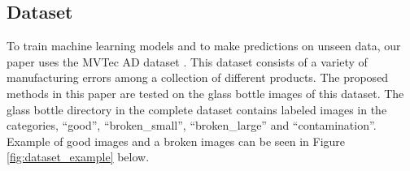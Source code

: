\subsection{Dataset}

To train machine learning models and to make predictions on unseen data, our paper uses the MVTec AD dataset \cite{mvtec-dataset}. This dataset consists of a variety of manufacturing errors among a collection of different products. The proposed methods in this paper are tested on the glass bottle images of this dataset. The glass bottle directory in the complete dataset contains labeled images in the categories, ``good'', ``broken\_small'', ``broken\_large'' and ``contamination''. Example of good images and a broken images can be seen in Figure \ref{fig:dataset_example} below.
